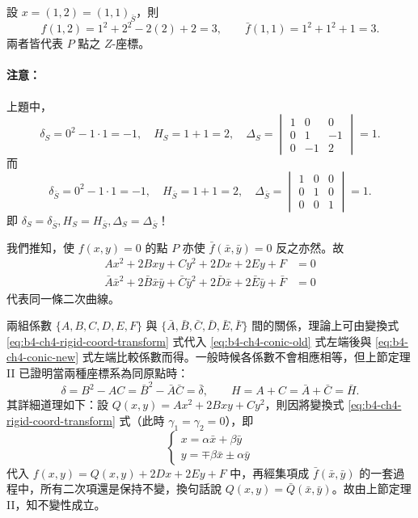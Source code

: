 設 $x = (1, 2) = (1, 1)_{\bar{S}}$，則
\[
f(1, 2) = 1^2 + 2^2 - 2(2) + 2 = 3, \qquad
\bar{f}(1, 1) = 1^2 + 1^2 + 1 = 3.
\]
兩者皆代表 $P$ 點之 $Z$-座標。

\paragraph{注意：}
上題中，
\[
\delta_S = 0^2 - 1 \cdot 1 = -1, \quad H_S = 1 + 1 = 2, \quad \Delta_S = \begin{vmatrix} 1 & 0 & 0 \\ 0 & 1 & -1 \\ 0 & -1 & 2 \end{vmatrix} = 1.
\]
而
\[
\delta_{\bar{S}} = 0^2 - 1 \cdot 1 = -1, \quad H_{\bar{S}} = 1 + 1 = 2, \quad \Delta_{\bar{S}} = \begin{vmatrix} 1 & 0 & 0 \\ 0 & 1 & 0 \\ 0 & 0 & 1 \end{vmatrix} = 1.
\]
即 $\delta_S = \delta_{\bar{S}}, H_S = H_{\bar{S}}, \Delta_S = \Delta_{\bar{S}}$！

我們推知，使 $f(x, y) = 0$ 的點 $P$ 亦使 $\bar{f}(\bar{x}, \bar{y}) = 0$ 反之亦然。故
\begin{align}
Ax^2 + 2Bxy + Cy^2 + 2Dx + 2Ey + F &= 0 \label{eq:b4-ch4-conic-old} \\
\bar{A}\bar{x}^2 + 2\bar{B}\bar{x}\bar{y} + \bar{C}\bar{y}^2 + 2\bar{D}\bar{x} + 2\bar{E}\bar{y} + \bar{F} &= 0 \label{eq:b4-ch4-conic-new}
\end{align}
代表同一條二次曲線。

兩組係數 $\{A, B, C, D, E, F\}$ 與 $\{\bar{A}, \bar{B}, \bar{C}, \bar{D}, \bar{E}, \bar{F}\}$ 間的關係，理論上可由變換式 \eqref{eq:b4-ch4-rigid-coord-transform} 式代入 \eqref{eq:b4-ch4-conic-old} 式左端後與 \eqref{eq:b4-ch4-conic-new} 式左端比較係數而得。一般時候各係數不會相應相等，但上節定理 II 已證明當兩種座標系為同原點時：
\[
\delta = B^2 - AC = \bar{B}^2 - \bar{A}\bar{C} = \bar{\delta}, \qquad
H = A + C = \bar{A} + \bar{C} = \bar{H}.
\]
其詳細道理如下：設 $Q(x, y) = Ax^2 + 2Bxy + Cy^2$，則因將變換式 \eqref{eq:b4-ch4-rigid-coord-transform} 式（此時 $\gamma_1 = \gamma_2 = 0$），即
\[
\begin{cases}
x = \alpha \bar{x} + \beta \bar{y} \\
y = \mp \beta \bar{x} \pm \alpha \bar{y}
\end{cases}
\]
代入 $f(x, y) = Q(x, y) + 2Dx + 2Ey + F$ 中，再經集項成 $\bar{f}(\bar{x}, \bar{y})$ 的一套過程中，所有二次項還是保持不變，換句話說 $Q(x, y) = \bar{Q}(\bar{x}, \bar{y})$。故由上節定理 II，知不變性成立。

